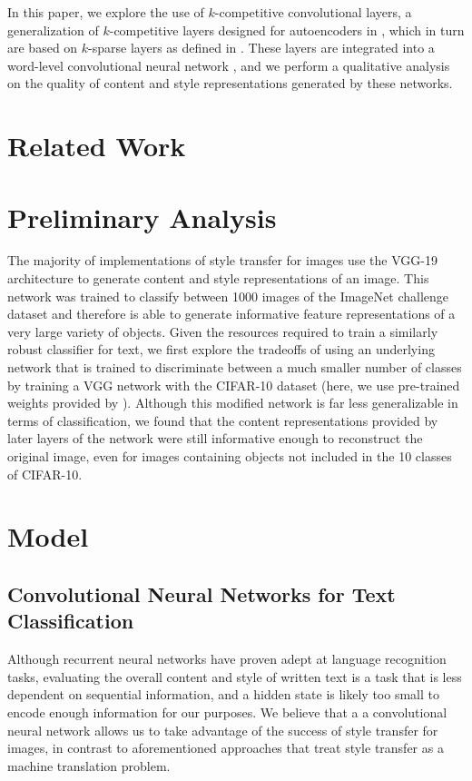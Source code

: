 \documentclass{vldb}
\begin{document}
In this paper, we explore the use of $k$-competitive convolutional layers, a generalization of $k$-competitive layers designed for autoencoders in \cite{KATE}, which in turn are based on $k$-sparse layers as defined in \cite{MakhzaniF13}. These layers are integrated into a word-level convolutional neural network \cite{Kim14f}, and we perform a qualitative analysis on the quality of content and style representations generated by these networks.

\section{Related Work}

\section{Preliminary Analysis}
The majority of implementations of style transfer for images use the VGG-19 \cite{VGG19} architecture to generate content and style representations of an image. This network was trained to classify between 1000 images of the ImageNet challenge dataset \cite{ILSVRC15} and therefore is able to generate informative feature representations of a very large variety of objects. Given the resources required to train a similarly robust classifier for text, we first explore the tradeoffs of using an underlying network that is trained to discriminate between a much smaller number of classes by training a VGG network with the CIFAR-10 dataset \cite{Krizhevsky09} (here, we use pre-trained weights provided by \cite{Liu15}). Although this modified network is far less generalizable in terms of classification, we found that the content representations provided by later layers of the network were still informative enough to reconstruct the original image, even for images containing objects not included in the 10 classes of CIFAR-10. 

\section{Model}
\subsection{Convolutional Neural Networks for Text Classification}
Although recurrent neural networks have proven adept at language recognition tasks, evaluating the overall content and style of written text is a task that is less dependent on sequential information, and a hidden state is likely too small to encode enough information for our purposes. We believe that a a convolutional neural network allows us to take advantage of the success of style transfer for images, in contrast to aforementioned approaches that treat style transfer as a machine translation problem.
\end{document}

